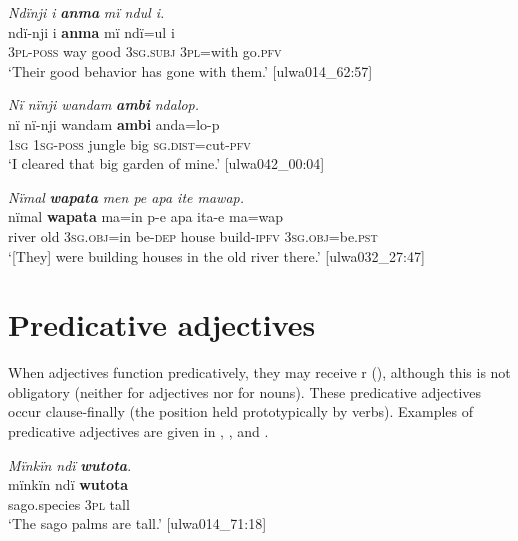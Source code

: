 \ea%
    \label{ex:adj:2}
           \textit{Ndïnji i} \textbf{\textit{anma}} \textit{mï ndul i.}\\
\gll    ndï-nji    i    \textbf{anma}  mï      ndï=ul    i\\
    3\textsc{pl-poss}  way  good  3\textsc{sg.subj}  3\textsc{pl}=with  go.\textsc{pfv}\\
\glt `Their good behavior has gone with them.’ [ulwa014\_62:57]
\z


\newpage

\ea%
    \label{ex:adj:3}
            \textit{Nï nïnji wandam} \textbf{\textit{ambi}} \textit{ndalop.}\\
\gll    nï    nï-nji    wandam  \textbf{ambi}  anda=lo-p\\
    1\textsc{sg}  1\textsc{sg-poss}  jungle    big    \textsc{sg.dist}=cut-\textsc{pfv}\\ 
\glt `I cleared that big garden of mine.’ [ulwa042\_00:04]
\z

\ea%
    \label{ex:adj:4}
            \textit{Nïmal} \textbf{\textit{wapata}} \textit{men pe apa ite mawap.}\\
\gll    nïmal  \textbf{wapata}  ma=in      p-e    apa    ita-e     ma=wap\\
    river  old     3\textsc{sg.obj}=in  be\textsc{{}-dep} house  build-\textsc{ipfv} 3\textsc{sg.obj}=be.\textsc{pst}\\
\glt `[They] were building houses in the old river there.’ [ulwa032\_27:47]
\z

\section{Predicative adjectives}\label{sec:5.2}


When adjectives function predicatively, they may receive r  (), although this is not obligatory (neither for adjectives nor for nouns). These predicative adjectives occur clause-finally (the position held prototypically by verbs). Examples of predicative adjectives are given in , , and .


\ea%
    \label{ex:adj:5}
            \textit{Mïnkïn ndï} \textbf{\textit{wutota}}.\\
\gll mïnkïn    ndï  \textbf{wutota}\\
    sago.species  3\textsc{pl}  tall\\
\glt `The sago palms are tall.’ [ulwa014\_71:18]
\z

